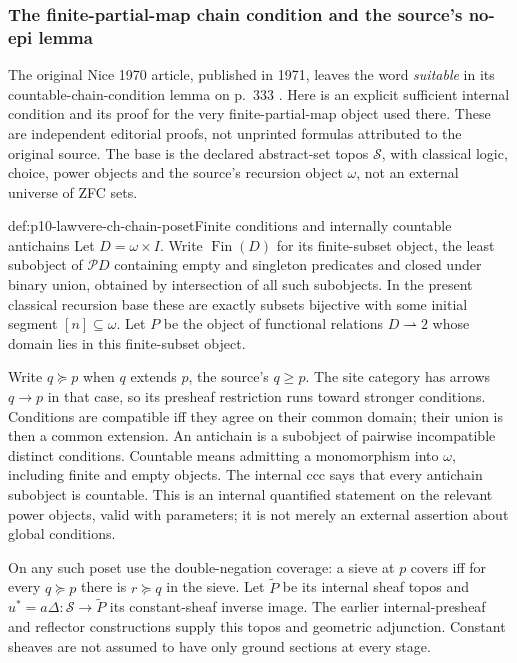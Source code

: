 \subsubsection{The finite-partial-map chain condition and the source's no-epi lemma}

The original Nice 1970 article, published in 1971, leaves the word
\emph{suitable} in its countable-chain-condition lemma on p.~333
\cite[p.~333]{Lawvere1970}. Here is an explicit sufficient internal
condition and its proof for the very finite-partial-map object used there.
These are independent editorial proofs, not unprinted formulas attributed
to the original source. The base is the declared abstract-set topos
\(\mathcal S\), with classical logic, choice, power objects and the source's
recursion object \(\omega\), not an external universe of ZFC sets.

\begin{hbdefinition}{def:p10-lawvere-ch-chain-poset}{Finite conditions and internally countable antichains}
Let \(D=\omega\times I\). Write \(\operatorname{Fin}(D)\) for its
finite-subset object, the least
subobject of \(\mathcal P D\) containing empty and singleton predicates
and closed under binary union, obtained by intersection of all such
subobjects. In the present classical recursion base these are exactly
subsets bijective with some initial segment \([n]\subseteq\omega\).
Let \(P\) be the object of functional relations \(D\rightharpoonup2\)
whose domain lies in this finite-subset object.

Write \(q\succeq p\) when \(q\) extends \(p\), the source's \(q\ge p\).
The site category has arrows \(q\to p\) in that case, so its presheaf
restriction runs toward stronger conditions. Conditions are compatible
iff they agree on their common domain; their union is then a common
extension. An antichain is a subobject of pairwise incompatible distinct
conditions. Countable means admitting a monomorphism into \(\omega\),
including finite and empty objects. The internal ccc says that every
antichain subobject is countable. This is an internal quantified statement
on the relevant power objects, valid with parameters; it is not merely an
external assertion about global conditions.

On any such poset use the double-negation coverage: a sieve at \(p\)
covers iff for every \(q\succeq p\) there is \(r\succeq q\) in the sieve.
Let \(\widetilde P\) be its internal sheaf topos and
\(u^*=a\Delta:\mathcal S\to\widetilde P\) its constant-sheaf inverse image.
The earlier internal-presheaf and reflector constructions supply this
topos and geometric adjunction. Constant sheaves are not assumed to have
only ground sections at every stage.
\end{hbdefinition}

